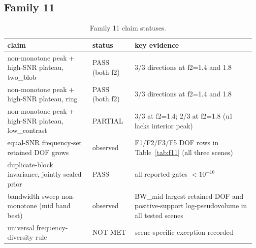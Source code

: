 \documentclass[12pt]{article}
\begin{document}
\subsection{Family 11}
\begin{table}[ht]
\centering
\small
\caption{Family 11 claim statuses.}
\label{app:tab:f11}
\begin{tabular}{p{} p{} p{}}
\toprule
claim & status & key evidence \\
\midrule
non-monotone peak + high-SNR plateau, two\_blob & PASS (both f2) &
3/3 directions at f2=1.4 and 1.8 \\
non-monotone peak + high-SNR plateau, ring & PASS (both f2) &
3/3 directions at f2=1.4 and 1.8 \\
non-monotone peak + high-SNR plateau, low\_contrast & PARTIAL &
3/3 at f2=1.4; 2/3 at f2=1.8 (u1 lacks interior peak) \\
equal-SNR frequency-set retained DOF grows & observed &
F1/F2/F3/F5 DOF rows in Table~\ref{tab:f11} (all three scenes) \\
duplicate-block invariance, jointly scaled prior & PASS &
all reported gates $<10^{-10}$ \\
bandwidth sweep non-monotone (mid band best) & observed &
BW\_mid largest retained DOF and positive-support log-pseudovolume in all
tested scenes \\
universal frequency-diversity rule & NOT MET &
scene-specific exception recorded \\
\bottomrule
\end{tabular}
\end{table}
\end{document}
